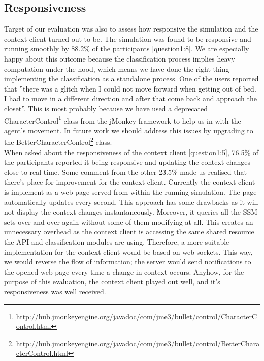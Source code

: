 \subsection{Responsiveness} %
\label{sec:eval_responsiveness}
Target of our evaluation was also to assess how responsive the simulation and the context client turned out to be. The simulation was found to be responsive and running smoothly by 88.2\% of the participants \ref{question1:8}. We are especially happy about this outcome because the classification process implies heavy computation under the hood, which means we have done the right thing implementing the classification as a standalone process. One of the users reported that ''there was a glitch when I could not move forward when getting out of bed. I had to move in a different direction and after that come back and approach the closet''. This is most probably because we have used a deprecated CharacterControl\footnote{\url{http://hub.jmonkeyengine.org/javadoc/com/jme3/bullet/control/CharacterControl.html}} class from the jMonkey framework to help us in with the agent's movement. In future work we should address this issues by upgrading to the BetterCharacterControl\footnote{\url{http://hub.jmonkeyengine.org/javadoc/com/jme3/bullet/control/BetterCharacterControl.html}} class.\\

When asked about the responsiveness of the context client \ref{question1:5}, 76.5\% of the participants reported it being responsive and updating the context changes close to real time. Some comment from the other 23.5\% made us realised that there's place for improvement for the context client. Currently the context client is implement as a web page served from within the running simulation. The page automatically updates every second. This approach has some drawbacks as it will not display the context changes instantaneously. Moreover, it queries all the SSM sets over and over again without some of them modifying at all. This creates an unnecessary overhead as the context client is accessing the same shared resource the API and classification modules are using. Therefore, a more suitable implementation for the context client would be based on web sockets. This way, we would reverse the flow of information; the server would send notifications to the opened web page every time a change in context occurs. Anyhow, for the purpose of this evaluation, the context client played out well, and it's responsiveness was well received.


